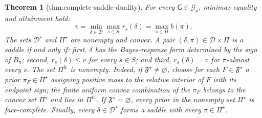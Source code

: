 \documentclass{article}
\newtheorem{theorem}{Theorem}
\begin{document}
\begin{theorem}[thm:complete-saddle-duality]\label{thm:complete-saddle-duality}
For every \(\mathsf G\in\mathcal G_p\), minimax equality and attainment hold: \[v=\min_{\delta\in\mathcal D}\max_{s\in S}r_s(\delta)=\max_{\pi\in\Pi}b(\pi).\] The sets \(\mathcal D^{\star}\) and \(\Pi^{\star}\) are nonempty and convex. A pair \((\delta,\pi)\in\mathcal D\times\Pi\) is a saddle if and only if: first, \(\delta\) has the Bayes-response form determined by the sign of \(B_{\pi}\); second, \(r_s(\delta)\le v\) for every \(s\in S\); and third, \(r_s(\delta)=v\) for \(\pi\)-almost every \(s\). The set \(\Pi^{\mathrm{fc}}\) is nonempty. Indeed, if \(\mathfrak F^{\star}\ne\varnothing\), choose for each \(F\in\mathfrak F^{\star}\) a prior \(\pi_F\in\Pi^{\star}\) assigning positive mass to the relative interior of \(F\) with its endpoint sign; the finite uniform convex combination of the \(\pi_F\) belongs to the convex set \(\Pi^{\star}\) and lies in \(\Pi^{\mathrm{fc}}\). If \(\mathfrak F^{\star}=\varnothing\), every prior in the nonempty set \(\Pi^{\star}\) is face-complete. Finally, every \(\delta\in\mathcal D^{\star}\) forms a saddle with every \(\pi\in\Pi^{\star}\).
\end{theorem}
\end{document}
